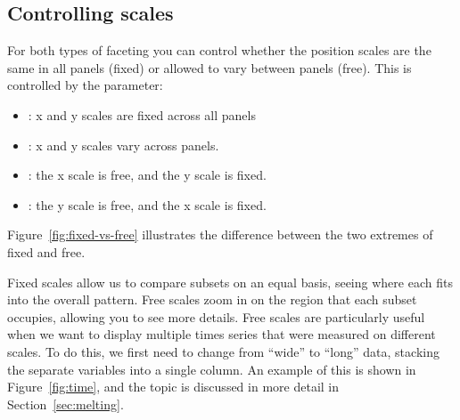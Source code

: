 \subsection{Controlling scales}
\label{sub:controlling_scales}

For both types of faceting you can control whether the position scales are the same in all panels (fixed) or allowed to vary between panels (free).  This is controlled by the  parameter:

\begin{itemize}
  \item {}: x and y scales are fixed across all panels
  \item {}: x and y scales vary across panels.
  \item {}: the x scale is free, and the y scale is fixed.
  \item {}: the y scale is free, and the x scale is fixed.
\end{itemize}

\noindent Figure~\ref{fig:fixed-vs-free} illustrates the difference between the two extremes of fixed and free.

% 

Fixed scales allow us to compare subsets on an equal basis, seeing where each fits into the overall pattern.  Free scales zoom in on the region that each subset occupies, allowing you to see more details. Free scales are particularly useful when we want to display multiple times series that were measured on different scales.  To do this, we first need to change from ``wide'' to ``long'' data, stacking the separate variables into a single column.  An example of this is shown in Figure~\ref{fig:time}, and the topic is discussed in more detail in Section~\ref{sec:melting}.  

% 


